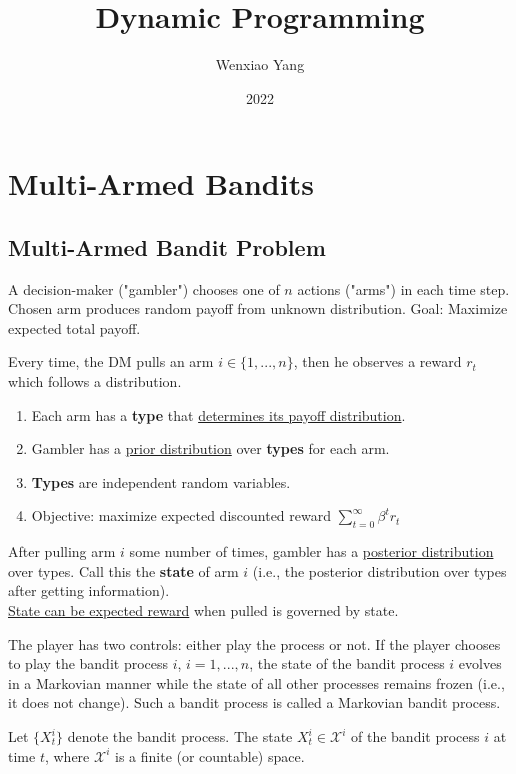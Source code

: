 \documentclass[11pt]{elegantbook}
\title{\textbf{Dynamic Programming}}
\author{Wenxiao Yang}
\institute{Department of Mathematics, University of Illinois at Urbana-Champaign}
\date{2022}
\begin{document}
\maketitle
\frontmatter
\tableofcontents
\mainmatter


\chapter{Multi-Armed Bandits}
\section{Multi-Armed Bandit Problem}
\begin{definition}
    A decision-maker ("gambler") chooses one of $n$ actions ("arms") in each time step. Chosen arm produces random payoff from unknown distribution. Goal: Maximize expected total payoff.
\end{definition}

Every time, the DM pulls an arm $i\in\{1,...,n\}$, then he observes a reward $r_t$ which follows a distribution.
\begin{enumerate}[$\bullet$]
    \item Each arm has a \textbf{type} that \underline{determines its payoff distribution}.
    \item Gambler has a \underline{prior distribution} over \textbf{types} for each arm.
    \item \textbf{Types} are independent random variables.
    \item Objective: maximize expected discounted reward $\sum_{t=0}^\infty \beta^t r_t$
\end{enumerate}
\begin{definition}[State]
    After pulling arm $i$ some number of times, gambler has a \underline{posterior distribution} over types. Call this the \textbf{state} of arm $i$ (i.e., the posterior distribution over types after getting information).\\
    \underline{State can be expected reward} when pulled is governed by state.
\end{definition}
The player has two controls: either play the process or not. If the player chooses to play the bandit process $i$, $i = 1,...,n$, the state of the bandit process $i$ evolves in a Markovian manner while the state of all other processes remains frozen (i.e., it does not change). Such a bandit process is called a Markovian bandit process.

Let $\{X_t^i\}$ denote the bandit process. The state $X_t^i\in \mathcal{X}^i$ of the bandit process $i$ at time $t$, where $\mathcal{X}^i$ is a finite (or countable) space.
\end{document}
